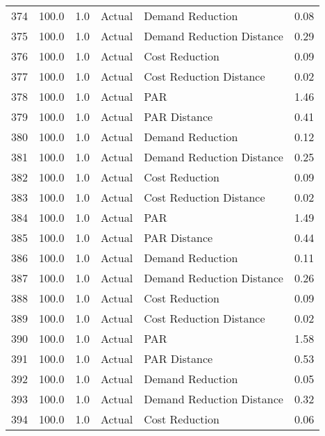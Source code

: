 \begin{longtable}{lrrllr}
374  &        100.0 &     1.0 &         Actual &           Demand Reduction &   0.08 \\
375  &        100.0 &     1.0 &         Actual &  Demand Reduction Distance &   0.29 \\
376  &        100.0 &     1.0 &         Actual &             Cost Reduction &   0.09 \\
377  &        100.0 &     1.0 &         Actual &    Cost Reduction Distance &   0.02 \\
378  &        100.0 &     1.0 &         Actual &                        PAR &   1.46 \\
379  &        100.0 &     1.0 &         Actual &               PAR Distance &   0.41 \\
380  &        100.0 &     1.0 &         Actual &           Demand Reduction &   0.12 \\
381  &        100.0 &     1.0 &         Actual &  Demand Reduction Distance &   0.25 \\
382  &        100.0 &     1.0 &         Actual &             Cost Reduction &   0.09 \\
383  &        100.0 &     1.0 &         Actual &    Cost Reduction Distance &   0.02 \\
384  &        100.0 &     1.0 &         Actual &                        PAR &   1.49 \\
385  &        100.0 &     1.0 &         Actual &               PAR Distance &   0.44 \\
386  &        100.0 &     1.0 &         Actual &           Demand Reduction &   0.11 \\
387  &        100.0 &     1.0 &         Actual &  Demand Reduction Distance &   0.26 \\
388  &        100.0 &     1.0 &         Actual &             Cost Reduction &   0.09 \\
389  &        100.0 &     1.0 &         Actual &    Cost Reduction Distance &   0.02 \\
390  &        100.0 &     1.0 &         Actual &                        PAR &   1.58 \\
391  &        100.0 &     1.0 &         Actual &               PAR Distance &   0.53 \\
392  &        100.0 &     1.0 &         Actual &           Demand Reduction &   0.05 \\
393  &        100.0 &     1.0 &         Actual &  Demand Reduction Distance &   0.32 \\
394  &        100.0 &     1.0 &         Actual &             Cost Reduction &   0.06 \\

\end{longtable}
